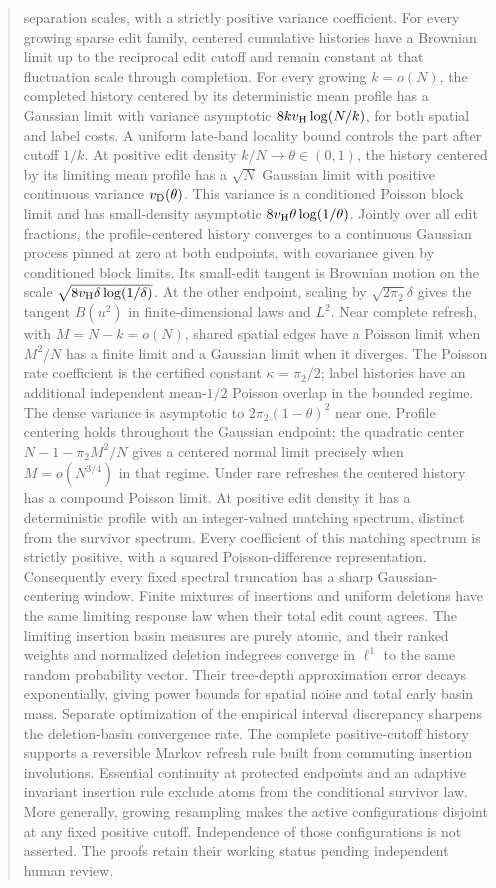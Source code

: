 \documentclass[11pt,letterpaper]{article}
\begin{document}
\begin{abstract}
separation scales, with a strictly positive variance coefficient.
For every growing sparse edit family, centered cumulative histories
have a Brownian limit up to the reciprocal edit cutoff and remain
constant at that fluctuation scale through completion.
For every growing $k=o(N)$, the completed history centered by its
deterministic mean profile has a Gaussian limit with variance asymptotic
$8kv_{\rm H}\log(N/k)$, for both spatial and label costs.
A uniform late-band locality bound controls the part after cutoff $1/k$.
At positive edit density $k/N\to\theta\in(0,1)$, the history centered
by its limiting mean profile has a $\sqrt N$ Gaussian limit with positive continuous
variance $v_{\rm D}(\theta)$. This variance is a conditioned
Poisson block limit and has small-density asymptotic
$8v_{\rm H}\theta\log(1/\theta)$.
Jointly over all edit fractions, the profile-centered history
converges to a continuous Gaussian process pinned at zero at
both endpoints, with covariance given by conditioned block limits.
Its small-edit tangent is Brownian motion on the scale
$\sqrt{8v_{\rm H}\delta\log(1/\delta)}$.
At the other endpoint, scaling by $\sqrt{2\pi_2}\delta$
gives the tangent $B(u^2)$ in finite-dimensional laws and $L^2$.
Near complete refresh, with $M=N-k=o(N)$, shared spatial edges
have a Poisson limit when $M^2/N$ has a finite limit and a Gaussian
limit when it diverges. The Poisson rate coefficient is the
certified constant $\kappa=\pi_2/2$; label histories have an
additional independent mean-$1/2$ Poisson overlap in the bounded
regime. The dense variance is asymptotic to $2\pi_2(1-\theta)^2$
near one. Profile centering holds throughout the Gaussian endpoint;
the quadratic center $N-1-\pi_2M^2/N$ gives a centered normal
limit precisely when $M=o(N^{3/4})$ in that regime.
Under rare refreshes the centered history has a compound Poisson limit.
At positive edit density it has a deterministic profile with an
integer-valued matching spectrum, distinct from the survivor spectrum.
Every coefficient of this matching spectrum is strictly positive,
with a squared Poisson-difference representation. Consequently every
fixed spectral truncation has a sharp Gaussian-centering window.
Finite mixtures of insertions and uniform deletions have the same
limiting response law when their total edit count agrees.
The limiting insertion basin measures are purely atomic, and their
ranked weights and normalized deletion indegrees converge in $\ell^1$
to the same random probability vector.
Their tree-depth approximation error decays exponentially, giving
power bounds for spatial noise and total early basin mass. Separate
optimization of the empirical interval discrepancy sharpens the
deletion-basin convergence rate.
The complete positive-cutoff history supports a reversible Markov
refresh rule built from commuting insertion involutions. Essential
continuity at protected endpoints and an adaptive invariant insertion
rule exclude atoms from the conditional survivor law. More generally,
growing resampling makes the active configurations disjoint at any fixed
positive cutoff. Independence of those configurations is not asserted.
The proofs retain their working status pending independent human review.
\end{abstract}
\end{document}
